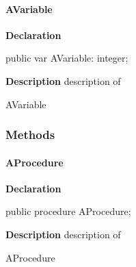 \documentclass{report}
\begin{document}
\paragraph*{AVariable}\hspace*{\fill}

\begin{list}{}{
\setlength{\itemindent}{0cm}
\setlength{\listparindent}{0cm}
\setlength{\leftmargin}{\evensidemargin}
\addtolength{\leftmargin}{\tmplength}
\settowidth{\labelsep}{X}
\addtolength{\leftmargin}{\labelsep}
\setlength{\labelwidth}{\tmplength}
}
\begin{flushleft}
\item[\textbf{Declaration}\hfill]
\begin{ttfamily}
public var AVariable: integer;\end{ttfamily}


\end{flushleft}
\par
\item[\textbf{Description}]
description of \begin{ttfamily}AVariable\end{ttfamily}

\end{list}
\subsubsection*{\large{\textbf{Methods}}\normalsize\hspace{1ex}\hfill}
\paragraph*{AProcedure}\hspace*{\fill}

\begin{list}{}{
\setlength{\itemindent}{0cm}
\setlength{\listparindent}{0cm}
\setlength{\leftmargin}{\evensidemargin}
\addtolength{\leftmargin}{\tmplength}
\settowidth{\labelsep}{X}
\addtolength{\leftmargin}{\labelsep}
\setlength{\labelwidth}{\tmplength}
}
\begin{flushleft}
\item[\textbf{Declaration}\hfill]
\begin{ttfamily}
public procedure AProcedure;\end{ttfamily}


\end{flushleft}
\par
\item[\textbf{Description}]
description of \begin{ttfamily}AProcedure\end{ttfamily}

\end{list}
\end{document}
